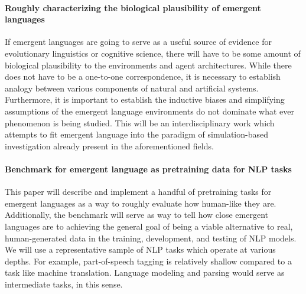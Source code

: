 \paragraph{Roughly characterizing the biological plausibility of emergent languages}
If emergent languages are going to serve as a useful source of evidence for evolutionary linguistics or cognitive science, there will have to be some amount of biological plausibility to the environments and agent architectures.
While there does not have to be a one-to-one correspondence, it is necessary to establish analogy between various components of natural and artificial systems.
Furthermore, it is important to establish the inductive biases and simplifying assumptions of the emergent language environments do not dominate what ever phenomenon is being studied.
This will be an interdisciplinary work which attempts to fit emergent language into the paradigm of simulation-based investigation already present in the aforementioned fields.

\paragraph{Benchmark for emergent language as pretraining data for NLP tasks}
This paper will describe and implement a handful of pretraining tasks for emergent languages as a way to roughly evaluate how human-like they are.
Additionally, the benchmark will serve as way to tell how close emergent languages are to achieving the general goal of being a viable alternative to real, human-generated data in the training, development, and testing of NLP models.
We will use a representative sample of NLP tasks which operate at various depths.
For example, part-of-speech tagging is relatively shallow compared to a task like machine translation.
Language modeling and parsing would serve as intermediate tasks, in this sense. 

